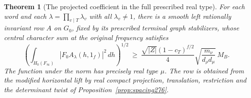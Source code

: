 \documentclass[a4paper,11pt]{article}
\newtheorem{theorem}[proposition]{Theorem}
\theoremstyle{definition}
\theoremstyle{remark}
\numberwithin{equation}{section}
\begin{document}
\begin{theorem}[The projected coefficient in the full prescribed real type]\leavevmode
\label{thm:types276}
For each word and each \(\lambda=\prod_{v\mid T}\lambda_v\)
with all \(\lambda_v\ne1\), there is a smooth left rationally
invariant row \(A\) on \(G_0\), fixed by its prescribed terminal
graph stabilizers, whose central character sum at the original
frequency satisfies
\[
 \left(\int_{H_0(F_\infty)}
     |F_0A_\lambda(h,1_f)|^2\,dh\right)^{1/2}
 \ \ge\
 \frac{\sqrt{|Z|}(1-c_T)^{f/2}}{4}
       \sqrt{\frac{m_\nu}{d_\rho d_\mu}}\,M_B .
\]
The function under the norm has precisely real type \(\mu\).
The row is obtained from the modified horizontal lift by
real compact projection, translation, restriction and the
determinant twist of Proposition~\ref{prop:spacing276}.
\end{theorem}
\end{document}
